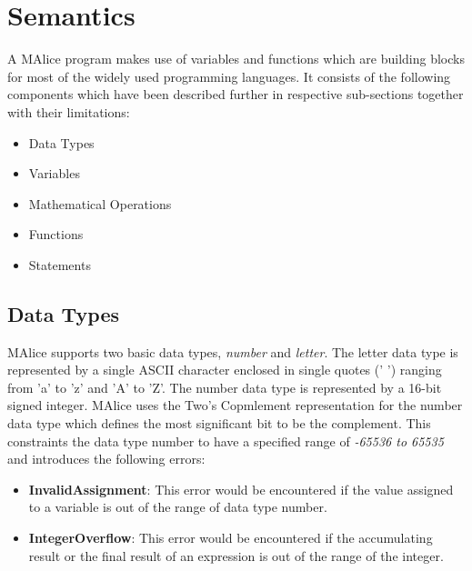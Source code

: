 \documentclass[a4wide, 11pt]{article}
\begin{document}
\begin{verbatim}
\end{verbatim}

\section{Semantics}
\label{sec:semantics}
	A MAlice program makes use of variables and functions which are building blocks for most of the widely used programming
	languages. It consists of the following components which have been described further in respective sub-sections
	together with their limitations:
	\begin{itemize}
		\item Data Types
		\item Variables 
		\item Mathematical Operations 
		\item Functions
		\item Statements
	\end{itemize}
	

	\subsection{Data Types}
	\label{sec:dtypes}		
		MAlice supports two basic data types, \emph{number} and \emph{letter}. The letter 
		data type is represented by a single ASCII character enclosed in single quotes (' ') ranging from 'a' to 'z' and 
		'A' to 'Z'. The number data type is represented by a 16-bit signed integer. MAlice uses the 
		Two's Copmlement representation for the number data type which defines
		the most significant bit to be the complement. This constraints the data type number 
		to have a specified range of \emph{-65536 to 65535} and introduces the following errors: 

			\begin{itemize}
				\item {\bf InvalidAssignment}: This error would be encountered if the value assigned to a variable
							is out of the range of data type number.
				\item {\bf IntegerOverflow}: This error would be encountered if the accumulating result or the final result
							of an expression is out of the range of the integer. 
			\end{itemize}
	
\end{document}
